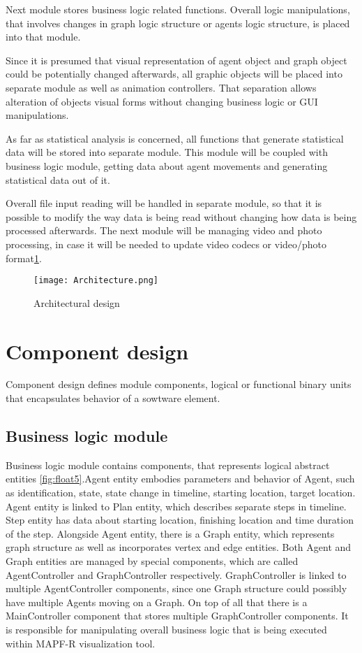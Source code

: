 \documentclass[thesis=B,english]{FITthesis}[2019/12/23]
\begin{document}
Next module stores business logic related functions. Overall logic manipulations, that involves changes in graph logic structure or agents logic structure, is placed into that module. 

Since it is presumed that visual representation of agent object and graph object could be potentially changed afterwards, all graphic objects will be placed into separate module as well as animation controllers. That separation allows alteration of objects visual forms without changing business logic or GUI manipulations. 

As far as statistical analysis is concerned, all functions that generate statistical data will be stored into separate module. This module will be coupled with business logic module, getting data about agent movements and generating statistical data out of it. 

Overall file input reading will be handled in separate module, so that it is possible to modify the way data is being read without changing how data is being processed afterwards. The next module will be managing video and photo processing, in case it will be needed to update video codecs or video/photo format\ref{fig:float4}. 

\begin{figure}
	\texttt{[image: Architecture.png]}
	\caption[Architecture]{Architectural design}\label{fig:float4}
\end{figure}



\section{Component design}

Component design defines module components, logical or functional binary units that encapsulates behavior of a sowtware element. 

\subsection{Business logic module}

Business logic module contains components, that represents logical abstract entities  \ref{fig:float5}.Agent entity embodies parameters and behavior of Agent, such as identification, state, state change in timeline, starting location, target location. Agent entity is linked to Plan entity, which describes separate steps in timeline. Step entity has data about starting location, finishing location and time duration of the step. Alongside Agent entity, there is a Graph entity, which represents graph structure as well as incorporates vertex and edge entities. Both Agent and Graph entities are managed by special components, which are called AgentController and GraphController respectively. GraphController is linked to multiple AgentController components, since one Graph structure could possibly have multiple Agents moving on a Graph. On top of all that there is a MainController component that stores multiple GraphController components. It is responsible for manipulating overall business logic that is being executed within MAPF-R visualization tool.
\end{document}
